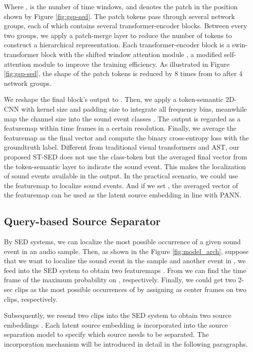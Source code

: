 \documentclass[letterpaper]{article} \usepackage{aaai22}  \usepackage{times}  \usepackage{helvet}  \usepackage{courier}  \usepackage[hyphens]{url}  \usepackage{graphicx} \urlstyle{rm} \def\UrlFont{\rm}  \usepackage{natbib}  \usepackage{caption} \DeclareCaptionStyle{ruled}{labelfont=normalfont,labelsep=colon,strut=off} \frenchspacing  \setlength{\pdfpagewidth}{8.5in}  \setlength{\pdfpageheight}{11in}  \usepackage{algorithm}
\begin{document}
Where ,  is the number of time windows, and  denotes the patch in the position shown by Figure \ref{fig:gsp-sed}.
The patch tokens pass through several network groups, each of which contains several transformer-encoder blocks. Between every two groups, we apply a patch-merge layer to reduce the number of tokens to construct a hierarchical representation. Each transformer-encoder block is a swin-transformer block with the shifted window attention module \cite{swintransformer}, a modified self-attention module to improve the training efficiency. As illustrated in Figure \ref{fig:gsp-sed}, the shape of the patch tokens is reduced by 8 times from  to  after 4 network groups.

We reshape the final block's output to . Then, we apply a token-semantic 2D-CNN \cite{tscam} with kernel size  and padding size  to integrate all frequency bins, meanwhile map the channel size  into the sound event classes . The output  is regarded as a featuremap within time frames in a certain resolution. Finally, we average the featuremap as the final vector  and compute the binary cross-entropy loss with the groundtruth label. 
Different from traditional visual transformers and AST, our proposed ST-SED does not use the class-token but the averaged final vector from the token-semantic layer to indicate the sound event. This makes the localization of sound events available in the output. In the practical scenario, we could use the featuremap  to localize sound events. And if we set , the averaged vector  of the featuremap  can be used as the latent source embedding in line with PANN.

\subsection{Query-based Source Separator}

By SED systems, we can localize the most possible occurrence of a given sound event in an audio sample. Then, as shown in the Figure \ref{fig:model_arch}, suppose that we want to localize the sound event  in the sample  and another event  in , we feed  into the SED system to obtain two featuremaps . From  we can find the time frame  of the maximum probability on , respectively. Finally, we could get two 2-sec clips  as the most possible occurrences of  by assigning  as center frames on two clips, respectively. 

Subsequently, we resend two clips  into the SED system to obtain two source embeddings . Each latent source embedding  is incorporated into the source separation model to specify which source needs to be separated. The incorporation mechanism will be introduced in detail in the following paragraphs.
\end{document}
